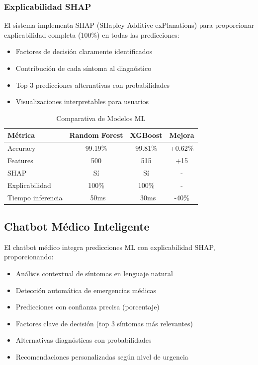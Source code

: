 \documentclass[12pt,a4paper]{article}
\begin{document}
\subsubsection{Explicabilidad SHAP}

El sistema implementa SHAP (SHapley Additive exPlanations) para proporcionar explicabilidad completa (100\%) en todas las predicciones:

\begin{itemize}
    \item Factores de decisión claramente identificados
    \item Contribución de cada síntoma al diagnóstico
    \item Top 3 predicciones alternativas con probabilidades
    \item Visualizaciones interpretables para usuarios
\end{itemize}

\begin{table}[H]
\centering
\caption{Comparativa de Modelos ML}
\begin{tabular}{|l|c|c|c|}
\hline
\textbf{Métrica} & \textbf{Random Forest} & \textbf{XGBoost} & \textbf{Mejora} \\
\hline
Accuracy & 99.19\% & 99.81\% & +0.62\% \\
\hline
Features & 500 & 515 & +15 \\
\hline
SHAP & Sí & Sí & - \\
\hline
Explicabilidad & 100\% & 100\% & - \\
\hline
Tiempo inferencia & ~50ms & ~30ms & -40\% \\
\hline
\end{tabular}
\end{table}

\subsection{Chatbot Médico Inteligente}

El chatbot médico integra predicciones ML con explicabilidad SHAP, proporcionando:

\begin{itemize}
    \item Análisis contextual de síntomas en lenguaje natural
    \item Detección automática de emergencias médicas
    \item Predicciones con confianza precisa (porcentaje)
    \item Factores clave de decisión (top 3 síntomas más relevantes)
    \item Alternativas diagnósticas con probabilidades
    \item Recomendaciones personalizadas según nivel de urgencia
\end{itemize}
\end{document}
